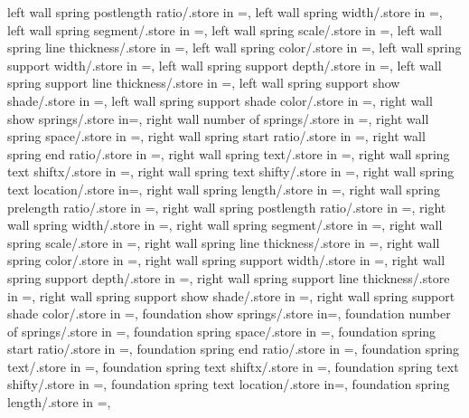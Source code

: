 {  left wall spring postlength ratio/.store in =\leftwpostlenratio,
  left wall spring width/.store in =\leftwampl,
  left wall spring segment/.store in =\leftwsegm,
  left wall spring scale/.store in =\leftwspringscale,
  left wall spring line thickness/.store in =\leftwspringthk,
  left wall spring color/.store in =\leftwspringcolor,
  left wall spring support width/.store in =\leftwsuppwidth,
  left wall spring support depth/.store in =\leftwsuppdepth,
  left wall spring support line thickness/.store in =\leftwsupplinethk,
  left wall spring support show shade/.store in =\leftwshowsuppshade,
  left wall spring support shade color/.store in =\leftwsuppshadecol,
  right wall show springs/.store in=\rightwshowsprings,
  right wall number of springs/.store in =\rightwspringnumber,
  right wall spring space/.store in =\rightwspringspace,
  right wall spring start ratio/.store in =\rightwspringstartratio,
  right wall spring end ratio/.store in =\rightwspringendratio,
  right wall spring text/.store in =\rightwspringtext,
  right wall spring text shiftx/.store in =\rightwtextshiftx,
  right wall spring text shifty/.store in =\rightwtextshifty,
  right wall spring text location/.store in=\rightwspringtextloc,
  right wall spring length/.store in =\rightwspringlength,
  right wall spring prelength ratio/.store in =\rightwprelenratio,
  right wall spring postlength ratio/.store in =\rightwpostlenratio,
  right wall spring width/.store in =\rightwampl,
  right wall spring segment/.store in =\rightwsegm,
  right wall spring scale/.store in =\rightwspringscale,
  right wall spring line thickness/.store in =\rightwspringthk,
  right wall spring color/.store in =\rightwspringcolor,
  right wall spring support width/.store in =\rightwsuppwidth,
  right wall spring support depth/.store in =\rightwsuppdepth,
  right wall spring support line thickness/.store in =\rightwsupplinethk,
  right wall spring support show shade/.store in =\rightwshowsuppshade,
  right wall spring support shade color/.store in =\rightwsuppshadecol,
  foundation show springs/.store in=\foundshowsprings,
  foundation number of springs/.store in =\foundspringnumber,
  foundation spring space/.store in =\foundspringspace,
  foundation spring start ratio/.store in =\foundspringstartratio,
  foundation spring end ratio/.store in =\foundspringendratio,
  foundation spring text/.store in =\foundspringtext,
  foundation spring text shiftx/.store in =\foundtextshiftx,
  foundation spring text shifty/.store in =\foundtextshifty,
  foundation spring text location/.store in=\foundspringtextloc,
  foundation spring length/.store in =\foundspringlength,
}
